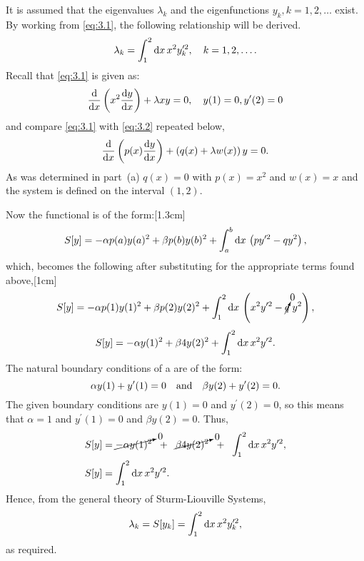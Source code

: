 It is assumed that the eigenvalues $\lambda_k$ and the eigenfunctions $y_k, k=1,2,\ldots$ exist. By working from \eqref{eq:3.1}, the following relationship will be derived.
\[
	\lambda_k = \int_{1}^{2}\mathrm{d} x\, x^2 y^{\prime2}_k, \quad k=1,2,\ldots.
\]
Recall that \eqref{eq:3.1} is given as:
\[
	\frac{\mathrm{d}}{\mathrm{d}x}\left(x^2\frac{\mathrm{d}y}{\mathrm{d}x}\right)+\lambda x y = 0,\quad y(1)=0, y^\prime(2)=0
\]
and compare \eqref{eq:3.1} with \eqref{eq:3.2} repeated below,
\[
	\frac{\mathrm{d}}{\mathrm{d}x}\left(p(x)\frac{\mathrm{d}y}{\mathrm{d}x}\right) + \left(q(x) + \lambda w(x)\right) y=0.
\]
As was determined in  part~(a) $q(x)=0$ with $p(x) = x^2$ and $w(x)=x$ and the system is defined on the interval $(1,2)$.

Now the functional is of the form:[1.3cm]
\[
	S[y] = -\alpha p(a)y(a)^2 + \beta p(b)y(b)^2 + \int_{a}^{b}\mathrm{d} x\, \left(py^{\prime2} - qy^2\right),
\]
which, becomes the following after substituting for the appropriate terms found above,[1cm]
\[
	S[y] = -\alpha p(1)y(1)^2 + \beta p(2)y(2)^2 + \int_{1}^{2}\mathrm{d} x\, \left(x^2y^{\prime2} - \cancelto{0}{q}\;y^2\right),
\]
\[
	S[y] = -\alpha y(1)^2 + \beta 4y(2)^2 + \int_{1}^{2}\mathrm{d} x\, x^2y^{\prime2}.
\]
The natural boundary conditions of a \sls are of the form:
\[
	\alpha y(1) + y^\prime(1) = 0\quad\text{and}\quad \beta y(2) + y^\prime(2)= 0.
\]
The given boundary conditions are $y(1)=0$ and $y^\prime(2)=0$, so this means that $\alpha=1$ and $y^\prime(1)=0$ and $\beta y(2)=0$.
Thus,
\begin{align*}
	S[y] &= \cancelto{0}{-\alpha y(1)^2}\;\; +\;\; \cancelto{0}{\beta 4y(2)^2}\;\; +\;\; \int_{1}^{2}\mathrm{d} x\, x^2y^{\prime2},\\
	S[y] &= \int_{1}^{2}\mathrm{d} x\, x^2y^{\prime2}.
\end{align*}
Hence, from the general theory of Sturm-Liouville Systems,
\[
	\lambda_k= S[y_k] = \int_{1}^{2}\mathrm{d} x\, x^2y_k^{\prime2},
\]
as required.